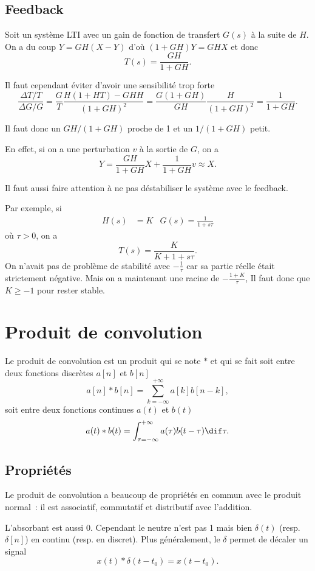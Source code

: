 \subsection{Feedback}
Soit un système LTI avec un gain de fonction de transfert $G(s)$ à la suite
de $H$.
On a du coup $Y = GH(X - Y)$ d'où $(1+GH)Y = GHX$ et donc
\[ T(s) = \frac{GH}{1+GH}. \]

Il faut cependant éviter d'avoir une sensibilité trop forte
\[ \frac{\Delta T/T}{\Delta G/G} =
\frac{G}{T}\frac{H(1 + HT) - GHH}{(1+GH)^2}
= \frac{G(1+GH)}{GH}\frac{H}{(1+GH)^2}
= \frac{1}{1+GH}. \]

Il faut donc un $GH/(1+GH)$ proche de 1 et un $1/(1+GH)$ petit.

En effet, si on a une perturbation $v$ à la sortie de $G$, on a
\[ Y = \frac{GH}{1+GH}X + \frac{1}{1+GH}v \approx X. \]

Il faut aussi faire attention à ne pas déstabiliser le système avec
le feedback.

Par exemple, si
\begin{align*}
  H(s) & = K & G(s) = \frac{1}{1+s\tau}
\end{align*}
où $\tau > 0$, on a
\[ T(s) = \frac{K}{K + 1 + s\tau}. \]
On n'avait pas de problème de stabilité avec $-\frac{1}{\tau}$ car sa partie
réelle était strictement négative.
Mais on a maintenant une racine de $-\frac{1+K}{\tau}$,
Il faut donc que $K \geq -1$ pour rester stable.


\annexe
\section{Produit de convolution}
Le produit de convolution est un produit qui se note $*$ et qui se fait
soit entre deux fonctions discrètes $a[n]$ et $b[n]$
\[ a[n] * b[n] = \sum_{k=-\infty}^{+\infty} a[k]b[n-k], \]
soit entre deux fonctions continues $a(t)$ et $b(t)$
\[ a(t) * b(t) = \int_{\tau=-\infty}^{+\infty} a(\tau)b(t-\tau) \dif \tau. \]

\subsection{Propriétés}
Le produit de convolution a beaucoup de propriétés en commun avec le produit
normal~: il est associatif, commutatif et distributif avec l'addition.

L'absorbant est aussi 0. Cependant le neutre n'est pas 1 mais bien
$\delta(t)$ (resp. $\delta[n]$) en continu (resp. en discret).
Plus généralement, le $\delta$ permet de décaler un signal
\[ x(t) * \delta(t - t_0) = x(t - t_0). \]

